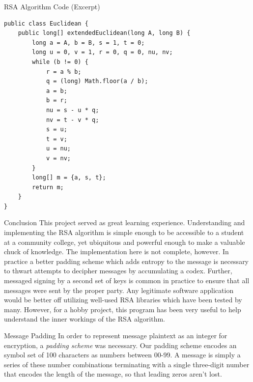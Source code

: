 \documentclass[landscape,fontscale=.8,paperwidth=24in,paperheight=18in]{baposter} %
\begin{document}
\begin{poster}
\begin{posterbox}[name=code,column=30,span=28,row=0]{RSA Algorithm Code (Excerpt)}
{\begin{verbatim}
public class Euclidean {
    public long[] extendedEuclidean(long A, long B) {
        long a = A, b = B, s = 1, t = 0;
        long u = 0, v = 1, r = 0, q = 0, nu, nv;
        while (b != 0) {
            r = a % b;
            q = (long) Math.floor(a / b);
            a = b;
            b = r;
            nu = s - u * q;
            nv = t - v * q;
            s = u;
            t = v;
            u = nu;
            v = nv;
        }
        long[] m = {a, s, t};
        return m;
    }
}
\end{verbatim}}

\end{posterbox}





\begin{posterbox}[name=conclusion, column=30, below=code, span=14]{Conclusion} 
This project served as great learning experience. Understanding and implementing the RSA algorithm is simple enough to be accessible to a student at a community college, yet ubiquitous and powerful enough to make a valuable chuck of knowledge. The implementation here is not complete, however. In practice a better padding scheme which adds entropy to the message is necessary to thwart attempts to decipher messages by accumulating a codex. Further, messaged signing by a second set of keys is common in practice to ensure that all messages were sent by the proper party. Any legitimate software application would be better off utilizing well-used RSA libraries which have been tested by many. However, for a hobby project, this program has been very useful to help understand the inner workings of the RSA algorithm.
\end{posterbox}



\begin{posterbox}[name=padding, column=44, below=code, span=14]{Message Padding}
In order to represent message plaintext as an integer for encryption, a \emph{padding scheme} was necessary. Our padding scheme encodes an symbol set of 100 characters as numbers between 00-99. A message is simply a series of these number combinations terminating with a single three-digit number that encodes the length of the message, so that leading zeros aren't lost.
\end{posterbox}




\end{poster}
\end{document}
